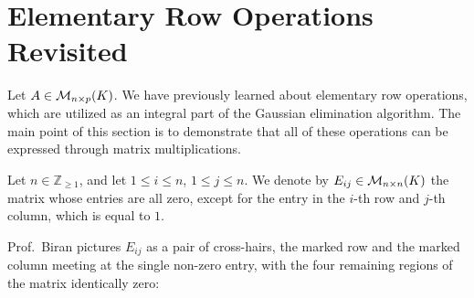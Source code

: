 \renewcommand{\thetheorem}{17.e.\arabic{theorem}}
\setcounter{theorem}{0}


\section{Elementary Row Operations Revisited}
\label{sec:eros_revisited}

Let $A \in \mathcal{M}_{n \times p}(K)$. We have previously learned about elementary row operations, which are utilized as an integral part of the Gaussian elimination algorithm. The main point of this section is to demonstrate that all of these operations can be expressed through matrix multiplications.

\begin{notation}
\label{not:matrix_units}
Let $n \in \mathbb{Z}_{\ge 1}$, and let $1 \le i \le n$, $1 \le j \le n$. We denote by $E_{ij} \in \mathcal{M}_{n \times n}(K)$ the matrix whose entries are all zero, except for the entry in the $i$-th row and $j$-th column, which is equal to $1$.
\end{notation}

Prof.~Biran pictures $E_{ij}$ as a pair of cross-hairs, the marked row and the marked column meeting at the single non-zero entry, with the four remaining regions of the matrix identically zero:

